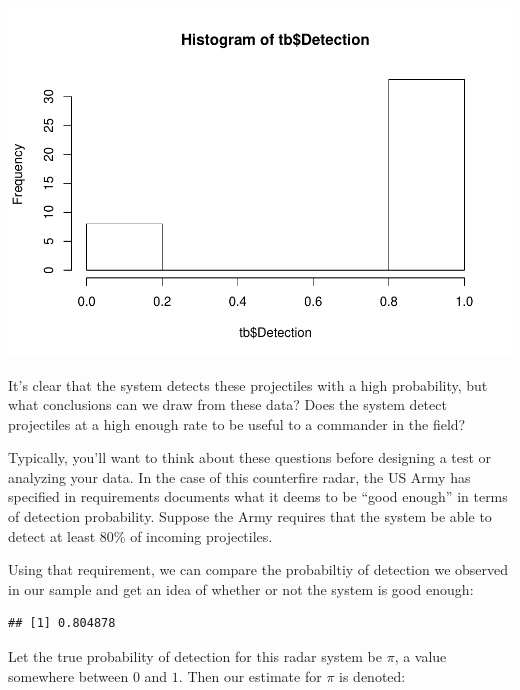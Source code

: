 \documentclass[
]{book}
\newenvironment{Shaded}{\begin{snugshade}}{\end{snugshade}}
\newcommand{\KeywordTok}[1]{\textcolor[rgb]{0.13,0.29,0.53}{\textbf{#1}}}
\newcommand{\NormalTok}[1]{#1}
\newcommand{\OperatorTok}[1]{\textcolor[rgb]{0.81,0.36,0.00}{\textbf{#1}}}
\newcommand{\StringTok}[1]{\textcolor[rgb]{0.31,0.60,0.02}{#1}}
\theoremstyle{definition}
\theoremstyle{definition}
\theoremstyle{definition}
\theoremstyle{remark}
\begin{document}
\includegraphics{StatisticalMethods_files/figure-latex/unnamed-chunk-15-1.pdf}

It's clear that the system detects these projectiles with a high probability, but what conclusions can we draw from these data? Does the system detect projectiles at a high enough rate to be useful to a commander in the field?

Typically, you'll want to think about these questions before designing a test or analyzing your data. In the case of this counterfire radar, the US Army has specified in requirements documents what it deems to be ``good enough'' in terms of detection probability. Suppose the Army requires that the system be able to detect at least 80\% of incoming projectiles.

Using that requirement, we can compare the probabiltiy of detection we observed in our sample and get an idea of whether or not the system is good enough:

\begin{Shaded}
\end{Shaded}

\begin{verbatim}
## [1] 0.804878
\end{verbatim}

Let the true probability of detection for this radar system be \(\pi\), a value somewhere between \(0\) and \(1\). Then our estimate for \(\pi\) is denoted:
\end{document}
